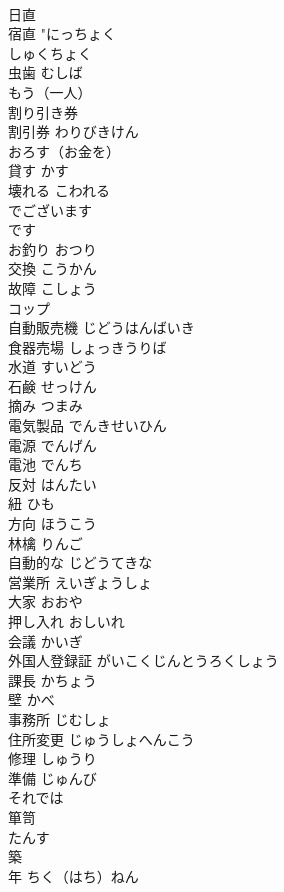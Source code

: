 \documentclass[8pt]{extreport}
\begin{document}
\begin{CJK}{UTF8}{min}
\\	日直　
\\	宿直	"にっちょく　
\\	しゅくちょく
\\	虫歯	むしば	
\\	もう（一人）		
\\	割り引き券
\\	割引券	わりびきけん	
\\	おろす（お金を）		
\\	貸す	かす	
\\	壊れる	こわれる	
\\	でございます		
\\	です	
\\	お釣り	おつり	
\\	交換	こうかん	
\\	故障	こしょう	
\\	コップ		
\\	自動販売機	じどうはんばいき	
\\	食器売場	しょっきうりば	
\\	水道	すいどう	
\\	石鹸	せっけん	
\\	摘み	つまみ	
\\	電気製品	でんきせいひん	
\\	電源	でんげん	
\\	電池	でんち	
\\	反対	はんたい	
\\	紐	ひも	
\\	方向	ほうこう	
\\	林檎	りんご	
\\	自動的な	じどうてきな	
\\	営業所	えいぎょうしょ	
\\	大家	おおや	
\\	押し入れ	おしいれ	
\\	会議	かいぎ	
\\	外国人登録証	がいこくじんとうろくしょう	
\\	課長	かちょう	
\\	壁	かべ	
\\	事務所	じむしょ	
\\	住所変更	じゅうしょへんこう	
\\	修理	しゅうり	
\\	準備	じゅんび	
\\	それでは		
\\	箪笥
\\	たんす		
\\	築
\\	年	ちく（はち）ねん	

\end{CJK}
\end{document}
